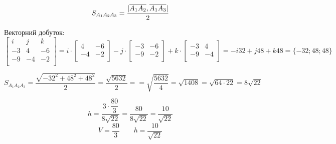 $$
S_{A_1A_2A_3} = \dfrac{ | \overline{A_1A_2},\overline{A_1A_3} | }{2}
$$

Векторний добуток:
$$
\begin{bmatrix}
  i &  j &  k \\
  -3 &  4 &  -6 \\
  -9 &  -4 &  -2 \\
\end{bmatrix} =
i \cdot \begin{bmatrix}
    4 &  -6 \\
   -4 &  -2 \\
\end{bmatrix} -
j \cdot \begin{bmatrix}

  -3 &     -6 \\
  -9 &     -2 \\
\end{bmatrix} +
k \cdot \begin{bmatrix}
  -3 &  4   \\
  -9 &  -4   \\
\end{bmatrix} = -i32 + j48 + k 48 = \{-32;48;48\}
$$

$$
S_{A_1A_2A_3} = \dfrac{ \sqrt{-32^2+48^2+48^2} }{2} = \dfrac{ \sqrt{5632} }{2} = = \sqrt{\dfrac{5632}{4}} = \sqrt{1408} = \sqrt{ 64 \cdot 22} = 8 \sqrt{22}
$$

$$
h = \dfrac{3 \cdot \dfrac{80}{3}}{8\sqrt{22}}
= \dfrac{80}{8\sqrt{22}}
= \dfrac{10}{\sqrt{22}}
$$
$$
\boxed{V=\dfrac{80}{3} \qquad h = \dfrac{10}{\sqrt{22}}}
$$
